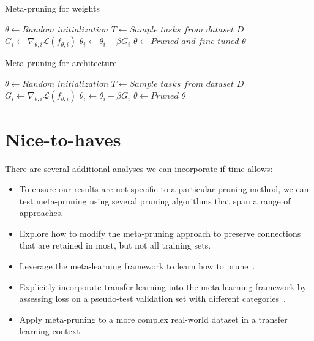 \documentclass{article}
\begin{document}
\begin{algorithm}[t]
	\caption{Meta-pruning for weights} \label{alg1}
	\begin{algorithmic}[1]
		\State $\theta \gets \textit{Random initialization}$
		\State $T \gets \textit{Sample tasks from dataset } D$
		\State $G_i \gets \nabla_{\theta,i} \mathcal{L} \left(f_{\theta,i}\right)$
		\State $\theta_i \gets \theta_i - \beta G_i$
		\EndFor
		\State $\theta \gets \textit{Pruned and fine-tuned } \theta$
		\EndFor
	\end{algorithmic}
\end{algorithm}

\begin{algorithm}[t]
	\caption{Meta-pruning for architecture} \label{alg2}
	\begin{algorithmic}[1]
		\State $\theta \gets \textit{Random initialization}$
		\State $T \gets \textit{Sample tasks from dataset } D$
		\State $G_i \gets \nabla_{\theta,i} \mathcal{L} \left(f_{\theta,i}\right)$
		\State $\theta_i \gets \theta_i - \beta G_i$
		\EndFor
		\State $\theta \gets \textit{Pruned } \theta$
		\EndFor
	\end{algorithmic}
\end{algorithm}

\section{Nice-to-haves}

There are several additional analyses we can incorporate if time allows:

\begin{itemize}
	\item To ensure our results are not specific to a particular pruning method, we can test meta-pruning using several pruning algorithms that span a range of approaches.
	\item Explore how to modify the meta-pruning approach to preserve connections that are retained in most, but not all training sets.
	\item Leverage the meta-learning framework to learn how to prune~\citet{NIPS_learning_weights_pruning}.
	\item Explicitly incorporate transfer learning into the meta-learning framework by assessing loss on a pseudo-test validation set with different categories~\citet{metalearning2}.
	\item Apply meta-pruning to a more complex real-world dataset in a transfer learning context.
\end{itemize}
\end{document}
